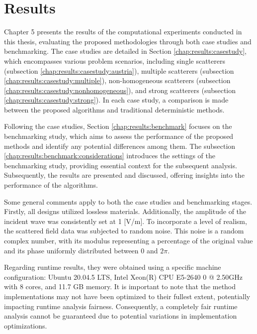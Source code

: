 
\renewcommand{\arraystretch}{1.3}

\chapter{Results}\label{chap:results}
	
	Chapter 5 presents the results of the computational experiments conducted in this thesis, evaluating the proposed methodologies through both case studies and benchmarking. The case studies are detailed in Section \ref{chap:results:casestudy}, which encompasses various problem scenarios, including single scatterers (subsection \ref{chap:results:casestudy:austria}), multiple scatterers (subsection \ref{chap:results:casestudy:multiple}), non-homogeneous scatterers (subsection \ref{chap:results:casestudy:nonhomogeneous}), and strong scatterers (subsection \ref{chap:results:casestudy:strong}). In each case study, a comparison is made between the proposed algorithms and traditional deterministic methods.
	
	Following the case studies, Section \ref{chap:results:benchmark} focuses on the benchmarking study, which aims to assess the performance of the proposed methods and identify any potential differences among them. The subsection \ref{chap:results:benchmark:considerations} introduces the settings of the benchmarking study, providing essential context for the subsequent analysis. Subsequently, the results are presented and discussed, offering insights into the performance of the algorithms.
	
	Some general comments apply to both the case studies and benchmarking stages. Firstly, all designs utilized lossless materials. Additionally, the amplitude of the incident wave was consistently set at 1 [V/m]. To incorporate a level of realism, the scattered field data was subjected to random noise. This noise is a random complex number, with its modulus representing a percentage of the original value and its phase uniformly distributed between $0$ and $2\pi$.
	
	Regarding runtime results, they were obtained using a specific machine configuration: Ubuntu 20.04.5 LTS, Intel Xeon(R) CPU E5-2640 0 @ 2.50GHz with 8 cores, and 11.7 GB memory. It is important to note that the method implementations may not have been optimized to their fullest extent, potentially impacting runtime analysis fairness. Consequently, a completely fair runtime analysis cannot be guaranteed due to potential variations in implementation optimizations.

